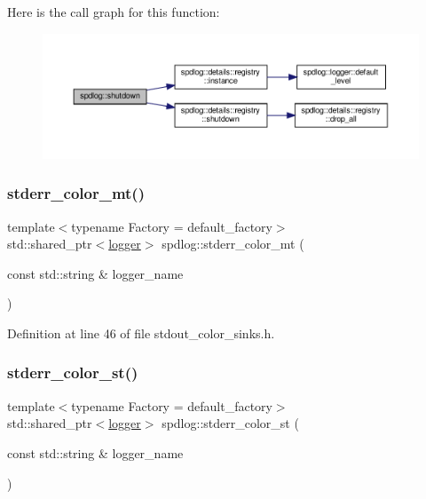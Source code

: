 Here is the call graph for this function\+:
\nopagebreak
\begin{figure}[H]
\begin{center}
\leavevmode
\includegraphics[width=350pt]{namespacespdlog_a38b5c05a859763c5e350e8ec3da9e328_cgraph}
\end{center}
\end{figure}
\mbox{\label{namespacespdlog_ab4647f73157c2a5647097e993eb648f5}} 
\subsubsection{\texorpdfstring{stderr\+\_\+color\+\_\+mt()}{stderr\_color\_mt()}}
{\footnotesize\ttfamily template$<$typename Factory  = default\+\_\+factory$>$ \\
std\+::shared\+\_\+ptr$<$\hyperlink{classspdlog_1_1logger}{logger}$>$ spdlog\+::stderr\+\_\+color\+\_\+mt (\begin{DoxyParamCaption}\item[{const std\+::string \&}]{logger\+\_\+name }\end{DoxyParamCaption})\hspace{0.3cm}{\ttfamily [inline]}}



Definition at line 46 of file stdout\+\_\+color\+\_\+sinks.\+h.

\mbox{\label{namespacespdlog_a5564a799e789be1856d238b0d91ecadb}} 
\subsubsection{\texorpdfstring{stderr\+\_\+color\+\_\+st()}{stderr\_color\_st()}}
{\footnotesize\ttfamily template$<$typename Factory  = default\+\_\+factory$>$ \\
std\+::shared\+\_\+ptr$<$\hyperlink{classspdlog_1_1logger}{logger}$>$ spdlog\+::stderr\+\_\+color\+\_\+st (\begin{DoxyParamCaption}\item[{const std\+::string \&}]{logger\+\_\+name }\end{DoxyParamCaption})\hspace{0.3cm}{\ttfamily [inline]}}



